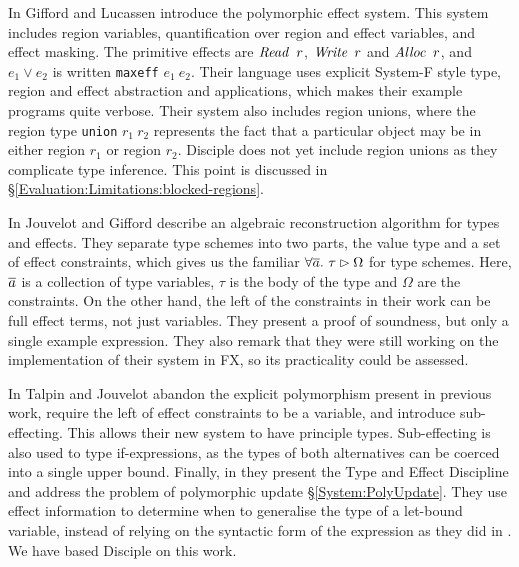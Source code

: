 In \cite{lucassen:polymorphic-effect-systems} Gifford and Lucassen introduce the polymorphic effect system. This system includes region variables, quantification over region and effect variables, and effect masking. The primitive effects are $\operatorname{\mathit{Read}} \ r$, $\operatorname{\mathit{Write}} \ r$ and $\operatorname{\mathit{Alloc}} \ r$, and $e_1 \lor e_2$ is written \texttt{maxeff} $e_1 \ e_2$. Their language uses explicit System-F style type, region and effect abstraction and applications, which makes their example programs quite verbose. Their system also includes region unions, where the region type \texttt{union} $r_1 \ r_2$ represents the fact that a particular object may be in either region $r_1$ or region $r_2$. Disciple does not yet include region unions as they complicate type inference. This point is discussed in \S\ref{Evaluation:Limitations:blocked-regions}.

In \cite{jouvelot:reconstruction-types-and-effects} Jouvelot and Gifford describe an algebraic reconstruction algorithm for types and effects. They separate type schemes into two parts, the value type and a set of effect constraints, which gives us the familiar $\forall \overline{a}. \ \tau \rhd \Omega$ for type schemes. Here, $\overline{a}$ is a collection of type variables, $\tau$ is the body of the type and $\Omega$ are the constraints. On the other hand, the left of the constraints in their work can be full effect terms, not just variables. They present a proof of soundness, but only a single example expression. They also remark that they were still working on the implementation of their system in FX, so its practicality could be assessed.

In \cite{talpin:polymorphic} Talpin and Jouvelot abandon the explicit polymorphism present in previous work, require the left of effect constraints to be a variable, and introduce sub-effecting. This allows their new system to have principle types. Sub-effecting is also used to type if-expressions, as the types of both alternatives can be coerced into a single upper bound. Finally, in \cite{talpin:discipline} they present the Type and Effect Discipline and address the problem of polymorphic update \S\ref{System:PolyUpdate}. They use effect information to determine when to generalise the type of a let-bound variable, instead of relying on the syntactic form of the expression as they did in \cite{jouvelot:reconstruction-types-and-effects}. We have based Disciple on this work.


